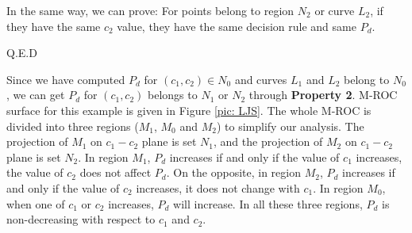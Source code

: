 In the same way, we can prove: For points belong to region $N_2$ or curve $L_2$, if they have the same $c_2$ value, they have the same decision rule and same $P_d$.

Q.E.D

Since we have computed $P_d$ for $(c_1, c_2) \in N_0$ and curves $L_1$ and $L_2$ belong to $N_0$, we can get $P_d$ for $(c_1, c_2)$ belongs to $N_1$ or $N_2$ through \textbf{Property 2}. M-ROC surface for this example is given in Figure  \ref{pic: LJS}.
The whole M-ROC is divided into three regions ($M_1$, $M_0$ and $M_2$) to simplify our analysis.  
 The projection of $M_1$ on $c_1-c_2$ plane is set $N_1$, and the projection of $M_2$ on $c_1-c_2$ plane is set $N_2$. 
In region $M_1$, $P_d$ increases if and only if the value of $c_1$ increases, the value of $c_2$ does not affect $P_d$. On the opposite, in region $M_2$, $P_d$ increases if and only if the value of $c_2$ increases, it does not change with $c_1$. In region $M_0$, when one of $c_1$ or $c_2$ increases, $P_d$ will increase. In all these three regions, $P_d$ is non-decreasing with respect to $c_1$ and $c_2$. 

